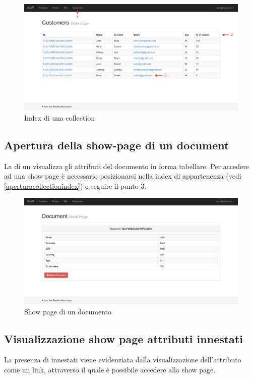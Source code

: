 	\begin{figure}[H]
		\centering \includegraphics[width=1\textwidth]{img/collection.png}
	\caption{ \label{fig:collection} Index di una collection}
	\end{figure}
	

	\subsection{Apertura della show-page di un document} %
	\label{aperturashowpage}
	La  di un  visualizza gli attributi del documento in forma tabellare. Per accedere ad una show page è necessario posizionarsi nella  index di appartenenza (vedi \ref{aperturacollectionindex}) e seguire il punto 3.

	\begin{figure}[H]
	\label{fig:showpage}
		\centering \includegraphics[width=1\textwidth]{img/showpage.png}
	\caption{Show page di un documento}
	\end{figure}

	\subsection{Visualizzazione show page attributi innestati} %
	La presenza di  innestati viene evidenziata dalla visualizzazione dell'attributo come un link, attraverso il quale è possibile accedere alla show page. 


